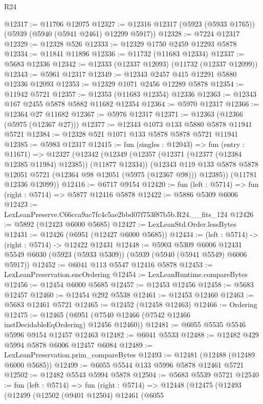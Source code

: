 \begin{lexlean}{R24}
\begin{coremodule}
@12317 := @11706 @12075
@12327 := @12316 @12317 (@5923 (@5933 @1765)) (@5939 (@5940 (@5941 @2461) @12299 @5917))
@12328 := @7224 @12317
@12329 := @12328 @526
@12333 := @12329 @1750 @2459 @12293 @5878
@12334 := @11841 @11896
@12336 := @11732 (@11683 @12334)
@12337 := @5683 @12336
@12342 := @12333 (@12337 @12093) (@11732 (@12337 @12099))
@12343 := @5961 @12317
@12349 := @12343 @2457 @415 @12291 @5880 @12336 @12093
@12353 := @12329 @1071 @2456 @12289 @5878
@12354 := @11942 @5721
@12357 := @12353 (@11683 @12354) @12336
@12363 := @12343 @167 @2455 @5878 @5882 @11682 @12354
@12364 := @5970 @12317
@12366 := @12364 @27 @11682
@12367 := @5976 @12317
@12371 := @12363 (@12366 (@5975 (@12367 @27)))
@12377 := @12343 @1073 @133 @5880 @5878 @11941 @5721
@12384 := @12328 @521 @1071 @133 @5878 @5878 @5721 @11941
@12385 := @5983 @12317
@12415 := fun (singles : @12043) =>
  fun (entry : @11671) =>
  @12327
    (@12342
      (@12349
        (@12357 (@12371 (@12377 (@12384 @12385 @11984) @12385)) (@11877 @12334))
        (@12343 @119 @133 @5878 @5878 @12051 @5721 (@12364 @98 @12051 (@5975 (@12367 @98))) @12385))
      (@11781 @12336 @12099))
@12416 := @6717 @9154
@12420 := fun (left : @5714) => fun (right : @5714) => @5877 @12416 @5878
@12422 := @5886 @5309 @6006
@12423 := LexLeanPreserve.C66cca9ac7fc4c5ae2bbd07f753f87b5b.R24.__fits_124
@12426 := @5892 (@12423 @6000 @5685)
@12427 := LexLeanStd.Order.lessBytes
@12431 := @12426 (@6951 (@12427 @6000 @5685))
@12434 := (left : @5714) -> (right : @5714) -> @12422 @12431
@12448 := @5903
    @5309
    @6006
    @12431
    @5549
    @6030
    (@5923 (@5933 @5309))
    (@5939 (@5940 (@5941 @5549) @6006 @5917))
@12452 := @6041 @113 @5547 @12416 @5878
@12453 := LexLeanPreservation.encOrdering
@12454 := LexLeanRuntime.compareBytes
@12456 := @12454 @6000 @5685
@12457 := @12453 @12456
@12458 := @5683 @12457
@12460 := @12454 @292 @5538
@12461 := @12453 @12460
@12463 := @5683 @12461 @5721
@12465 := @12452 (@12458 @12463)
@12466 := Ordering
@12475 := @12465 (@6951 (@7540 @12466 (@7542 @12466 instDecidableEqOrdering) @12456 @12460))
@12481 := @6055 @5535 @5546 @5996 @9154 @12457 @12463
@12482 := @6041 @5533
@12488 := @12482 @429 @5994 @5878 @6006 @12457 @6084
@12489 := LexLeanPreservation.prim_compareBytes
@12493 := @12481 (@12488 (@12489 @6000 @5685))
@12499 := @6055 @5544 @133 @5996 @5878 @12461 @5721
@12502 := @12482 @5543 @5994 @5878
@12504 := @5683 @5539 @5721
@12540 := fun (left : @5714) =>
  fun (right : @5714) =>
  @12448
    (@12475
      (@12493
        (@12499
          (@12502
            (@9401 @12504)
            @12461
            (@6055

\end{coremodule}
\end{lexlean}
